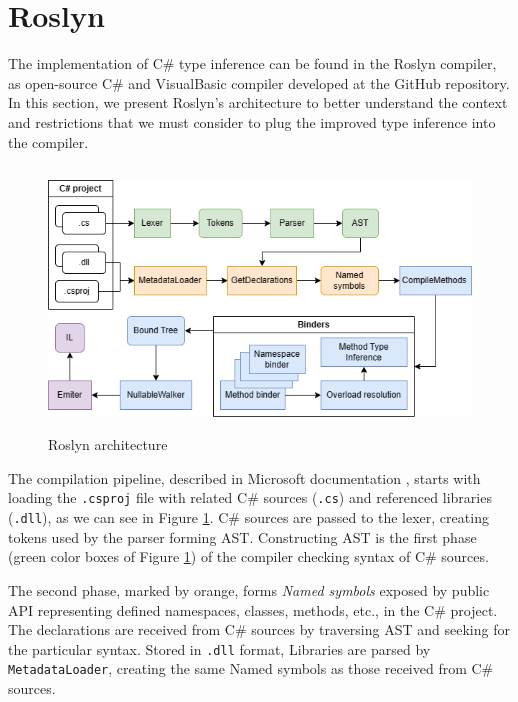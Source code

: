\section{Roslyn}

The implementation of C\# type inference can be found in the Roslyn compiler, as open-source C\# and VisualBasic compiler developed at the GitHub repository. 
In this section, we present Roslyn’s architecture to better understand the context and restrictions that we must consider to plug the improved type inference into the compiler.
\par
\begin{figure}
\centering
\includegraphics[width=120mm, height=70mm]{./img/Roslyn_Arch.png}
\caption{Roslyn architecture}
\label{img56:roslynPip}
\end{figure}
\par
{}
The compilation pipeline, described in Microsoft documentation \cite{online:roslynArchitecture}, starts with loading the \texttt{.csproj} file with related C\# sources (\texttt{.cs}) and referenced libraries (\texttt{.dll}), as we can see in Figure \ref{img56:roslynPip}.
C\# sources are passed to the lexer, creating tokens used by the parser forming \ac{AST}.
Constructing \ac{AST} is the first phase (green color boxes of Figure \ref{img56:roslynPip}) of the compiler checking syntax of C\# sources.
\par
{}
The second phase, marked by orange, forms \emph{Named symbols} exposed by public API representing defined namespaces, classes, methods, etc., in the C\# project. 
The declarations are received from C\# sources by traversing AST and seeking for the particular syntax. Stored in \texttt{.dll} format, Libraries are parsed by \texttt{MetadataLoader}, creating the same Named symbols as those received from C\# sources.
